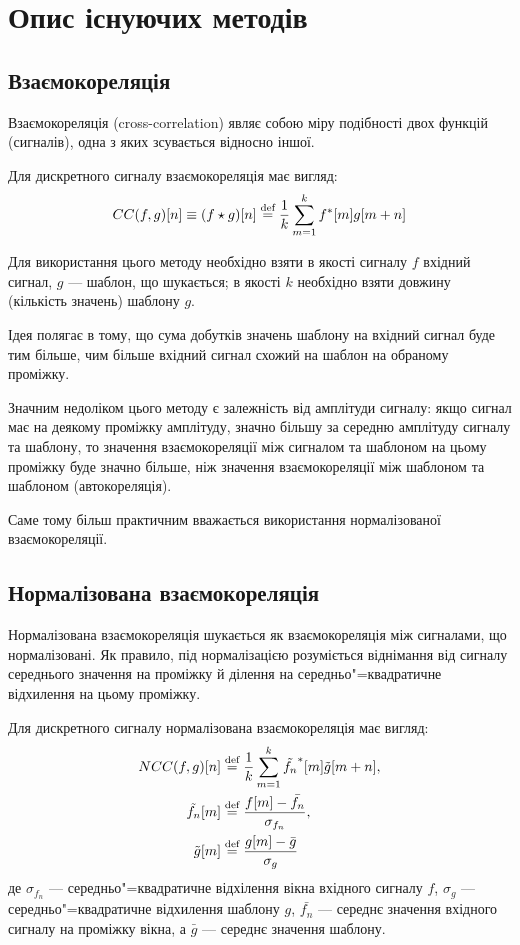 \section{Опис існуючих методів}
    \subsection{Взаємокореляція}
        Взаємокореляція (cross-correlation) являє собою міру подібності двох функцій (сигналів), одна з яких
        зсувається відносно іншої.

        Для дискретного сигналу взаємокореляція має вигляд:
        \begin{equation}
            CC(f,g)[ n ] \equiv (f \star g)[ n ] \stackrel{\text{def}}{=} \frac{1}{k}\sum\limits_{m=1}^{k} f^*[m] g[ m + n ]
        \end{equation}

        Для використання цього методу необхідно взяти в якості сигналу $f$ вхідний сигнал, $g$ --- шаблон, що
        шукається; в якості $k$ необхідно взяти довжину (кількість значень) шаблону $g$.

        Ідея полягає в тому, що сума добутків значень шаблону на вхідний сигнал буде тим більше, чим більше вхідний
        сигнал схожий на шаблон на обраному проміжку.

        Значним недоліком цього методу є залежність від амплітуди сигналу: якщо сигнал має на деякому проміжку
        амплітуду, значно більшу за середню амплітуду сигналу та шаблону, то значення взаємокореляції між сигналом та
        шаблоном на цьому проміжку буде значно більше, ніж значення взаємокореляції між шаблоном та шаблоном
        (автокореляція).

        Саме тому більш практичним вважається використання нормалізованої взаємокореляції.
    \subsection{Нормалізована взаємокореляція}
        Нормалізована взаємокореляція шукається як взаємокореляція між сигналами, що нормалізовані.
        Як правило, під нормалізацією розуміється віднімання від сигналу середнього значення на проміжку й ділення на
        середньо"=квадратичне відхилення на цьому проміжку.

        Для дискретного сигналу нормалізована взаємокореляція має вигляд:
        \begin{align}
            NCC(f,g)[ n ] &\stackrel{\text{def}}{=} \frac{1}{k} \sum\limits_{m=1}^{k} \tilde{f_n}^*[m] \tilde{g}[ m + n ],\\
            \tilde{f_n}[m] &\stackrel{\text{def}}{=} \frac{f[m] - \bar{f_n}}{\sigma_{f_n}},\\
            \tilde{g}[m]   &\stackrel{\text{def}}{=} \frac{g[m] - \bar{g}}{\sigma_g}
        \end{align}
        де $\sigma_{f_n}$ --- середньо"=квадратичне відхілення вікна вхідного сигналу $f$, $\sigma_g$ ---
        середньо"=квадратичне відхилення шаблону $g$, $\bar{f_n}$ --- середнє значення вхідного сигналу на проміжку
        вікна, а $\bar{g}$ --- середнє значення шаблону.

